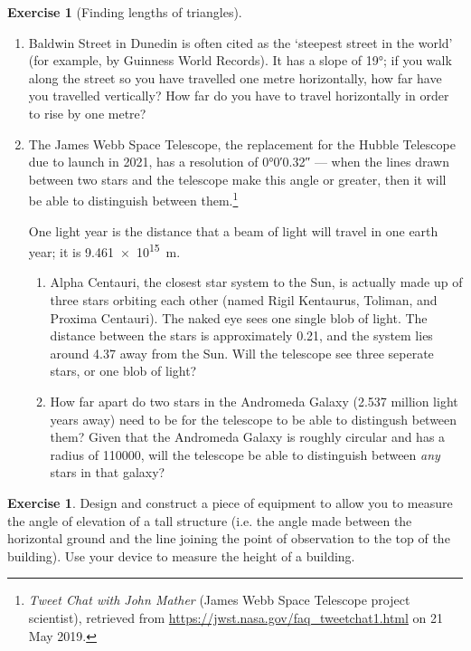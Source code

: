 \documentclass[a4paper]{report}
\theoremstyle{definition}
\newtheorem{exercise}[thm]{Exercise}
\begin{document}
\begin{exercise}[Finding lengths of triangles]
\begin{enumerate}
      \item Baldwin Street in Dunedin is often cited as the `steepest street in the world' (for example, by Guinness World Records).
            It has a slope of \ang{19}; if you walk along the street so you have travelled one metre horizontally, how far have you
            travelled vertically? How far do you have to travel horizontally in order to rise by one metre?
      \item The James Webb Space Telescope, the replacement for the Hubble Telescope due to launch in 2021, has a resolution of \ang{0;0;0.32} ---
            when the lines drawn between two stars and the telescope make this angle or greater, then it will be able to distinguish between them.\footnote{\textit{Tweet Chat with John Mather} (James Webb Space Telescope project scientist), retrieved from \url{https://jwst.nasa.gov/faq_tweetchat1.html} on 21 May 2019.}

            One light year is the distance that a beam of light will travel in one earth year; it is \SI{9.461e15}{\metre}.
        \begin{enumerate}
          \item Alpha Centauri, the closest star system to the Sun, is actually made up of three stars orbiting each other (named Rigil Kentaurus,
                Toliman, and Proxima Centauri). The naked eye sees one single blob of light. The distance between the stars is approximately \SI{0.21}{\lightyear},
                and the system lies around \SI{4.37}{\lightyear} away from the Sun. Will the telescope see three seperate stars, or one blob of light?
          \item How far apart do two stars in the Andromeda Galaxy (2.537 million light years away) need to be for the telescope to be able to
                distingush between them? Given that the Andromeda Galaxy is roughly circular and has a radius of \SI{110000}{\lightyear},
                will the telescope be able to distinguish between \emph{any} stars in that galaxy?
        \end{enumerate}
    \end{enumerate}
  \end{exercise}

  \begin{exercise}
    Design and construct a piece of equipment to allow you to measure the angle of elevation of a tall structure (i.e. the
    angle made between the horizontal ground and the line joining the point of observation to the top of the building). Use
    your device to measure the height of a building.
  \end{exercise}
\end{document}
